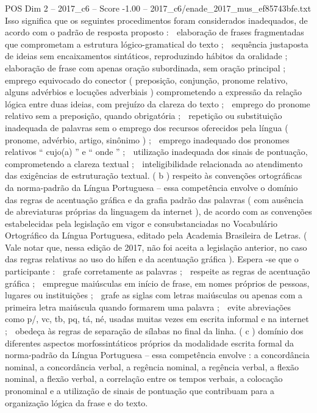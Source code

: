 \begin{textsample}{POS Dim 2 – 2017\_c6 – Score -1.00 – 2017\_c6/enade\_2017\_mus\_ef85743bfe.txt}
Isso significa que os seguintes procedimentos foram considerados inadequados, de acordo com o padrão de resposta proposto :  elaboração de frases fragmentadas que comprometam a estrutura lógico-gramatical do texto ;  sequência justaposta de ideias sem encaixamentos sintáticos, reproduzindo hábitos da oralidade ;  elaboração de frase com apenas oração subordinada, sem oração principal ;  emprego equivocado do conector ( preposição, conjunção, pronome relativo, alguns advérbios e locuções adverbiais ) comprometendo a expressão da relação lógica entre duas ideias, com prejuízo da clareza do texto ;  emprego do pronome relativo sem a preposição, quando obrigatória ;  repetição ou substituição inadequada de palavras sem o emprego dos recursos oferecidos pela língua ( pronome, advérbio, artigo, sinônimo ) ;  emprego inadequado dos pronomes relativos “ cujo(a) ” e “ onde ” ;  utilização inadequada dos sinais de pontuação, comprometendo a clareza textual ;  inteligibilidade relacionada ao atendimento das exigências de estruturação textual. ( b ) respeito às convenções ortográficas da norma-padrão da Língua Portuguesa – essa competência envolve o domínio das regras de acentuação gráfica e da grafia padrão das palavras ( com ausência de abreviaturas próprias da linguagem da internet ), de acordo com as convenções estabelecidas pela legislação em vigor e consubstanciadas no Vocabulário Ortográfico da Língua Portuguesa, editado pela Academia Brasileira de Letras. ( Vale notar que, nessa edição de 2017, não foi aceita a legislação anterior, no caso das regras relativas ao uso do hífen e da acentuação gráfica ).
Espera -se que o participante :  grafe corretamente as palavras ;  respeite as regras de acentuação gráfica ;  empregue maiúsculas em início de frase, em nomes próprios de pessoas, lugares ou instituições ;  grafe as siglas com letras maiúsculas ou apenas com a primeira letra maiúscula quando formarem uma palavra ;  evite abreviações como p/, vc, tb, pq, tá, né, usadas muitas vezes em escrita informal e na internet ;  obedeça às regras de separação de sílabas no final da linha. ( c ) domínio dos diferentes aspectos morfossintáticos próprios da modalidade escrita formal da norma-padrão da Língua Portuguesa – essa competência envolve : a concordância nominal, a concordância verbal, a regência nominal, a regência verbal, a flexão nominal, a flexão verbal, a correlação entre os tempos verbais, a colocação pronominal e a utilização de sinais de pontuação que contribuam para a organização lógica da frase e do texto.

\end{textsample}
